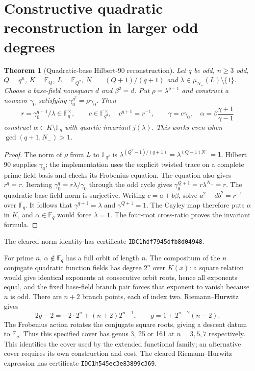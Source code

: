\documentclass[11pt]{article}
\newtheorem{theorem}{Theorem}
\newcommand{\F}{\mathbb F}
\begin{document}
\section{Constructive quadratic reconstruction in larger odd degrees}
\begin{theorem}[Quadratic-base Hilbert-90 reconstruction]
Let $q$ be odd, $n\ge3$ odd, $Q=q^n$, $K=\F_Q$, $L=\F_{Q^2}$,
$N_-=(Q+1)/(q+1)$ and $\lambda\in\mu_{N_-}(L)\setminus\{1\}$.
Choose a base-field nonsquare $d$ and $\beta^2=d$.
Put $\rho=\lambda^{q-1}$ and construct a nonzero $\gamma_0$ satisfying
$\gamma_0^{q^2}=\rho\gamma_0$. Then
\[
 r=\gamma_0^{q+1}/\lambda\in\F_q^\times,\qquad
 c\in\F_{q^2}^\times,\quad c^{q+1}=r^{-1},\qquad
 \gamma=c\gamma_0,\quad \alpha=\beta\frac{\gamma+1}{\gamma-1}
\]
construct $\alpha\in K\setminus\F_q$ with quartic invariant $j(\lambda)$.
This works even when $\gcd(q+1,N_-)>1$.
\end{theorem}
\begin{proof}
The norm of $\rho$ from $L$ to $\F_{q^2}$ is
$\lambda^{(Q^2-1)/(q+1)}=\lambda^{(Q-1)N_-}=1$.
Hilbert 90 supplies $\gamma_0$; the implementation uses the explicit
twisted trace on a complete prime-field basis and checks its Frobenius equation.
The equation also gives $r^q=r$. Iterating
$\gamma_0^q=r\lambda/\gamma_0$ through the odd cycle gives
$\gamma_0^{Q+1}=r\lambda^{N_-}=r$.
The quadratic-base-field norm is surjective. Writing $c=a+b\beta$, solve
$a^2-db^2=r^{-1}$ over $\F_q$. It follows that
$\gamma^{q+1}=\lambda$ and $\gamma^{Q+1}=1$.
The Cayley map therefore puts $\alpha$ in $K$, and $\alpha\in\F_q$ would
force $\lambda=1$. The four-root cross-ratio proves the invariant formula.
\end{proof}
The cleared norm identity has certificate \texttt{IDC1hdf7945dfb8d04948}.

For prime $n$, $\alpha\notin\F_q$ has a full orbit of length $n$.
The compositum of the $n$ conjugate quadratic function fields has degree
$2^n$ over $K(x)$: a square relation would give identical exponents at
consecutive orbit roots, hence all exponents equal, and the fixed base-field
branch pair forces that exponent to vanish because $n$ is odd.
There are $n+2$ branch points, each of index two. Riemann--Hurwitz gives
\[
 2g-2=-2\cdot2^n+(n+2)2^{n-1},\qquad
 g=1+2^{n-2}(n-2).
\]
The Frobenius action rotates the conjugate square roots, giving a descent
datum to $\F_q$. Thus this specified cover has genus 3, 25 or 161 at
$n=3,5,7$ respectively. This identifies the cover used by the extended
functional family; an alternative cover requires its own construction and cost.
The cleared Riemann--Hurwitz expression has certificate
\texttt{IDC1h545ec3e83899c369}.
\end{document}
